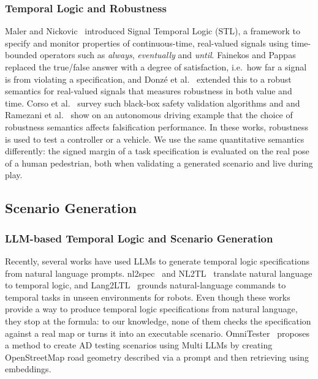 \documentclass[preprint,12pt]{elsarticle}
\begin{document}
\subsubsection{Temporal Logic and Robustness}
Maler and Nickovic~\cite{maler2004monitoring} introduced Signal Temporal Logic (STL), a framework to specify and monitor properties of continuous-time, real-valued signals using time-bounded operators such as \emph{always}, \emph{eventually} and \emph{until}. Fainekos and Pappas~\cite{fainekos2009robustness} replaced the true/false answer with a degree of satisfaction, i.e.\ how far a signal is from violating a specification, and Donz\'e et al.~\cite{donze2010robust} extended this to a robust semantics for real-valued signals that measures robustness in both value and time. Corso et al.~\cite{corso2021blackbox} survey such black-box safety validation algorithms and and Ramezani et al.~\cite{ramezani2019semantics} show on an autonomous driving example that the choice of robustness semantics affects falsification performance. In these works, robustness is used to test a controller or a vehicle. We use the same quantitative semantics differently: the signed margin of a task specification is evaluated on the real pose of a human pedestrian, both when validating a generated scenario and live during play.

\subsection{Scenario Generation}
\subsubsection{LLM-based Temporal Logic and Scenario Generation}
Recently, several works have used LLMs to generate temporal logic specifications from natural language prompts. nl2spec~\cite{cosler2023nl2spec} and NL2TL~\cite{chen2023nl2tl} translate natural language to temporal logic, and Lang2LTL~\cite{liu2023lang2ltl} grounds natural-language commands to temporal tasks in unseen environments for robots. Even though these works provide a way to produce temporal logic specifications from natural language, they stop at the formula: to our knowledge, none of them checks the specification against a real map or turns it into an executable scenario. OmniTester~\cite{todo} proposes a method to create AD testing scenarios using Multi LLMs by creating OpenStreetMap road geometry described via a prompt and then retrieving using embeddings. 
\end{document}

